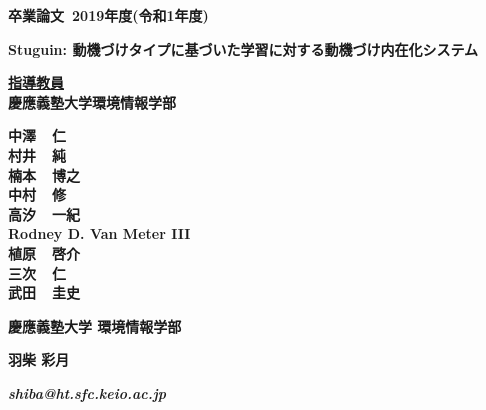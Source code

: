 \pagestyle{empty}

\begin{center}

\vspace{5cm}

\textbf{\Large 卒業論文~2019年度(令和1年度)}

\vspace{2cm}

\textbf{\LARGE Stuguin: 動機づけタイプに基づいた学習に対する動機づけ内在化システム}

\vspace{3cm}

\textbf{\underline{\large 指導教員}}\\
\textbf{慶應義塾大学環境情報学部}

\textbf{\Large 中澤~~仁}\\
\textbf{\Large 村井~~純}\\
\textbf{\Large 楠本~~博之}\\
\textbf{\Large 中村~~修}\\
\textbf{\Large 高汐~~一紀}\\
\textbf{\Large Rodney D. Van Meter III}\\
\textbf{\Large 植原~~啓介}\\
\textbf{\Large 三次~~仁}\\
\textbf{\Large 武田~~圭史}\\

\vspace{6cm}

\textbf{\LARGE 慶應義塾大学 環境情報学部}

\vspace{.5em}

\textbf{\LARGE 羽柴 彩月}

\vspace{.3em}

\textbf{\it shiba@ht.sfc.keio.ac.jp}



\newpage

\end{center}

\pagestyle{plain}

